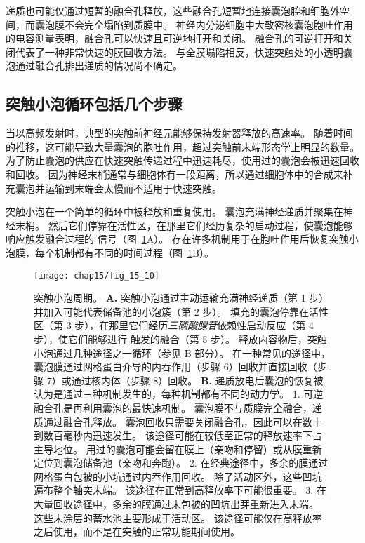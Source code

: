 递质也可能仅通过短暂的融合孔释放，这些融合孔短暂地连接囊泡腔和细胞外空间，而囊泡膜不会完全塌陷到质膜中。
神经内分泌细胞中大致密核囊泡胞吐作用的电容测量表明，融合孔可以快速且可逆地打开和关闭。
融合孔的可逆打开和关闭代表了一种非常快速的膜回收方法。
与全膜塌陷相反，快速突触处的小透明囊泡通过融合孔排出递质的情况尚不确定。



\subsection{突触小泡循环包括几个步骤}

当以高频发射时，典型的突触前神经元能够保持发射器释放的高速率。
随着时间的推移，这可能导致大量囊泡的胞吐作用，超过突触前末端形态学上明显的数量。
为了防止囊泡的供应在快速突触传递过程中迅速耗尽，使用过的囊泡会被迅速回收和回收。
因为神经末梢通常与细胞体有一段距离，所以通过细胞体中的合成来补充囊泡并运输到末端会太慢而不适用于快速突触。


突触小泡在一个简单的循环中被释放和重复使用。
囊泡充满神经递质并聚集在神经末梢。
然后它们停靠在活性区，在那里它们经历复杂的启动过程，使囊泡能够响应触发融合过程的  信号（图~\ref{fig:15_10}A）。
存在许多机制用于在胞吐作用后恢复突触小泡膜，每个机制都有不同的时间过程（图~\ref{fig:15_10}B）。


\begin{figure}[htbp]
	\centering
	\texttt{[image: chap15/fig\_15\_10]}
	\caption{突触小泡周期。
		\textbf{A.} 突触小泡通过主动运输充满神经递质（第 1 步）并加入可能代表储备池的小泡簇（第 2 步）。
		填充的囊泡停靠在活性区（第 3 步），在那里它们经历\textit{三磷酸腺苷}依赖性启动反应（第 4 步），使它们能够进行  触发的融合（第 5 步）。
		释放内容物后，突触小泡通过几种途径之一循环（参见 B 部分）。
		在一种常见的途径中，囊泡膜通过网格蛋白介导的内吞作用（步骤 6）回收并直接回收（步骤 7）或通过核内体（步骤 8）回收。
		\textbf{B.} 递质放电后囊泡的恢复被认为是通过三种机制发生的，每种机制都有不同的动力学。
		1. 可逆融合孔是再利用囊泡的最快速机制。
		囊泡膜不与质膜完全融合，递质通过融合孔释放。
		囊泡回收只需要关闭融合孔，因此可以在数十到数百毫秒内迅速发生。
		该途径可能在较低至正常的释放速率下占主导地位。
		用过的囊泡可能会留在膜上（亲吻和停留）或从膜重新定位到囊泡储备池（亲吻和奔跑）。
		2. 在经典途径中，多余的膜通过网格蛋白包被的小坑通过内吞作用回收。
		除了活动区外，这些凹坑遍布整个轴突末端。
		该途径在正常到高释放率下可能很重要。
		3. 在大量回收途径中，多余的膜通过未包被的凹坑出芽重新进入末端。
		这些未涂层的蓄水池主要形成于活动区。
		该途径可能仅在高释放率之后使用，而不是在突触的正常功能期间使用\cite{schweizer1995vesicle}。}
	\label{fig:15_10}
\end{figure}


